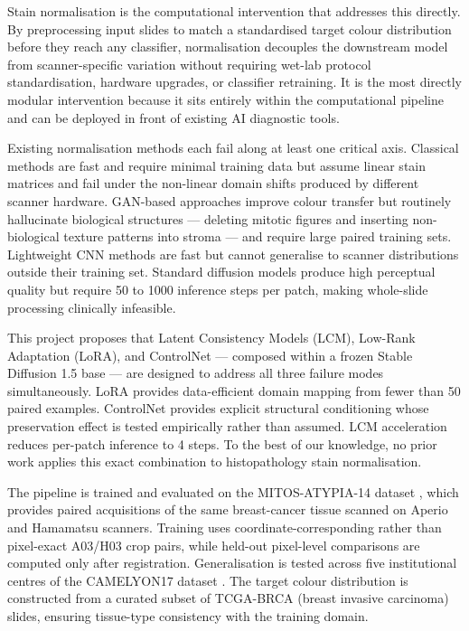 \documentclass[a4paper,twoside,12pt]{report}
\begin{document}
Stain normalisation is the computational intervention that addresses this directly. By preprocessing input slides to match a standardised target colour distribution before they reach any classifier, normalisation decouples the downstream model from scanner-specific variation without requiring wet-lab protocol standardisation, hardware upgrades, or classifier retraining. It is the most directly modular intervention because it sits entirely within the computational pipeline and can be deployed in front of existing AI diagnostic tools.

Existing normalisation methods each fail along at least one critical axis. Classical methods \citep{macenko2009normalisation, reinhard2001colortransfer} are fast and require minimal training data but assume linear stain matrices and fail under the non-linear domain shifts produced by different scanner hardware. GAN-based approaches \citep{shaban2019staingan} improve colour transfer but routinely hallucinate biological structures --- deleting mitotic figures and inserting non-biological texture patterns into stroma --- and require large paired training sets. Lightweight CNN methods \citep{kang2021stainnet} are fast but cannot generalise to scanner distributions outside their training set. Standard diffusion models produce high perceptual quality but require 50 to 1000 inference steps per patch, making whole-slide processing clinically infeasible.

This project proposes that Latent Consistency Models (LCM), Low-Rank Adaptation (LoRA), and ControlNet --- composed within a frozen Stable Diffusion 1.5 base ---  are designed to address all three failure modes simultaneously. LoRA provides data-efficient domain mapping from fewer than 50 paired examples. ControlNet provides explicit structural conditioning whose preservation effect is tested empirically rather than assumed. LCM acceleration reduces per-patch inference to 4 steps. To the best of our knowledge, no prior work applies this exact combination to histopathology stain normalisation.

The pipeline is trained and evaluated on the MITOS-ATYPIA-14 dataset \citep{roux2014mitos}, which provides paired acquisitions of the same breast-cancer tissue scanned on Aperio and Hamamatsu scanners. Training uses coordinate-corresponding rather than pixel-exact A03/H03 crop pairs, while held-out pixel-level comparisons are computed only after registration. Generalisation is tested across five institutional centres of the CAMELYON17 dataset \citep{bandi2018camelyon17}. The target colour distribution is constructed from a curated subset of TCGA-BRCA (breast invasive carcinoma) slides, ensuring tissue-type consistency with the training domain.
\end{document}
